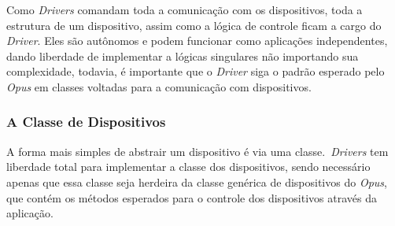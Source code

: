 Como \emph{Drivers} comandam toda a comunicação com os dispositivos, toda a estrutura de um dispositivo, assim como a lógica de controle
ficam a cargo do \emph{Driver}. Eles são autônomos e podem funcionar como aplicações independentes, dando liberdade de implementar a lógicas
singulares não importando sua complexidade, todavia, é importante que o \emph{Driver} siga o padrão esperado pelo \emph{Opus} em classes
voltadas para a comunicação com dispositivos.

\subsubsection{A Classe de Dispositivos}
A forma mais simples de abstrair um dispositivo é via uma classe.\ \emph{Drivers} tem liberdade total para implementar a classe dos dispositivos,
sendo necessário apenas que essa classe seja herdeira da classe genérica de dispositivos do \emph{Opus}, que contém os métodos esperados para 
o controle dos dispositivos através da aplicação.




%

